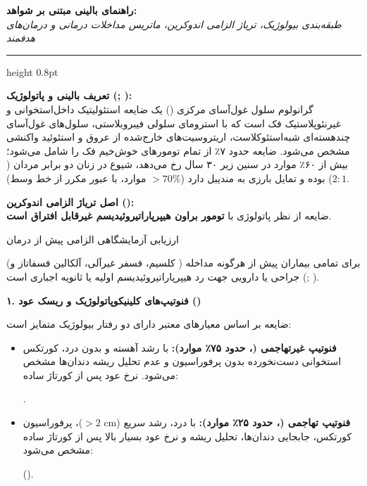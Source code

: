 \documentclass[a4paper]{article}
\newcommand{\hlg}[1]{\colorbox{hlgray}{\strut #1}}
\newcommand{\hly}[1]{\colorbox{hlyellow}{\strut #1}}
\newcommand{\hlr}[1]{\colorbox{hlred}{\strut\color{darkred}#1}}
\begin{document}

\begin{center}
{\Large\bfseries راهنمای بالینی مبتنی بر شواهد: }\\[2pt]
{\small\itshape طبقه‌بندی بیولوژیک، تریاژ الزامی اندوکرین، ماتریس مداخلات درمانی و درمان‌های هدفمند}
\end{center}
\vspace{-4pt}
\hrule height 0.8pt
\vspace{4pt}

\textbf{تعریف بالینی و پاتولوژیک (; ):}\\
گرانولوم سلول غول‌آسای مرکزی () یک ضایعه استئولیتیک داخل‌استخوانی و غیرنئوپلاستیک فک است که با استرومای سلولی فیبروبلاستی، سلول‌های غول‌آسای چند‌هسته‌ای شبه‌استئوکلاست، اریتروسیت‌های خارج‌شده از عروق و استئوئید واکنشی مشخص می‌شود. ضایعه  حدود ۷٪ از تمام تومورهای خوش‌خیم فک را شامل می‌شود؛ بیش از ۶۰٪ موارد در سنین زیر ۳۰ سال رخ می‌دهد، شیوع در زنان دو برابر مردان ($2:1$) بوده و تمایل بارزی به مندیبل دارد ($>70\%$ موارد، با عبور مکرر از خط وسط).

\textbf{اصل تریاژ الزامی اندوکرین ():}\\
ضایعه  از نظر پاتولوژی با \textbf{تومور براون هیپرپاراتیروئیدیسم غیرقابل افتراق است}. \hly{ارزیابی آزمایشگاهی الزامی پیش از درمان} (کلسیم، فسفر غیرآلی، آلکالین فسفاتاز و ) برای تمامی بیماران پیش از هرگونه مداخله جراحی یا دارویی جهت رد هیپرپاراتیروئیدیسم اولیه یا ثانویه اجباری است (\href{https://pubmed.ncbi.nlm.nih.gov/29751369/}{}; ).

\vspace{2pt}
{\large\bfseries ۱. فنوتیپ‌های کلینیکوپاتولوژیک و ریسک عود ()}
\vspace{1pt}

ضایعه  بر اساس معیارهای معتبر  دارای دو رفتار بیولوژیک متمایز است:
\begin{itemize}
    \item \textbf{فنوتیپ غیرتهاجمی (، حدود ۷۵٪ موارد):} با رشد آهسته و بدون درد، کورتکس استخوانی دست‌نخورده بدون پرفوراسیون و عدم تحلیل ریشه دندان‌ها مشخص می‌شود. نرخ عود پس از کورتاژ ساده: \hlg{}.
    \item \textbf{فنوتیپ تهاجمی (، حدود ۲۵٪ موارد):} با درد، رشد سریع ($>2\text{ cm}$)، پرفوراسیون کورتکس، جابجایی دندان‌ها، تحلیل ریشه و نرخ عود بسیار بالا پس از کورتاژ ساده مشخص می‌شود: \hlr{\textbf{}} ().
\end{itemize}
\end{document}
